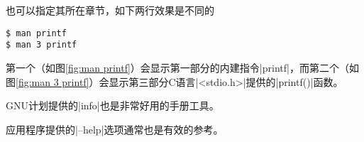 \documentclass[cs4size,a4paper,nofonts]{ctexart}
\begin{document}
\begin{enumerate}[label={(\arabic*)}]
\begin{figure}[htp]
\end{figure}

也可以指定其所在章节，如下两行效果是不同的
\begin{Verbatim}
$ man printf
$ man 3 printf
\end{Verbatim}
第一个（如图\ref{fig:man printf}）会显示第一部分的内建指令|printf|，而第二个（如图\ref{fig:man 3 printf}）会显示第三部分C语言|<stdio.h>|提供的|printf()|函数。

\begin{figure}[htp]
\begin{minipage}[t]{0.5\textwidth}\end{minipage}
\begin{minipage}[t]{0.5\textwidth}\end{minipage}
\end{figure}

GNU计划提供的|info|也是非常好用的手册工具。

应用程序提供的|--help|选项通常也是有效的参考。

\end{enumerate}
\end{document}
